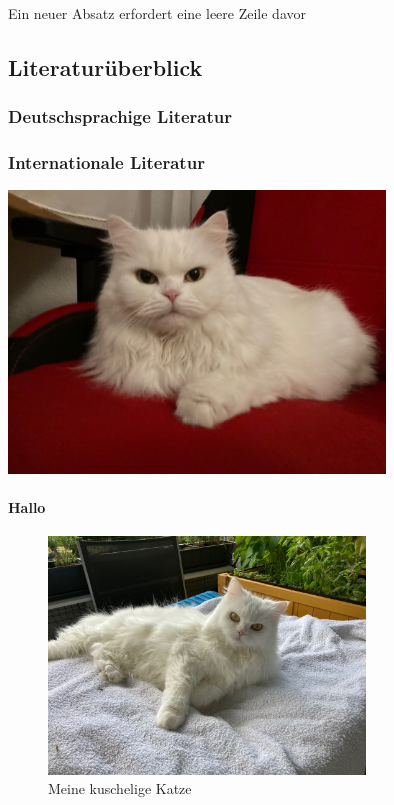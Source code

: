\documentclass[12pt,parskip=half]{scrartcl}
\begin{document}
Ein neuer Absatz erfordert eine leere Zeile davor

\blindtext[5]

\subsection{Literaturüberblick}
\subsubsection{Deutschsprachige Literatur}

\blindtext[5]

\subsubsection{Internationale Literatur}

\blindtext[5]

\begin{center}
\includegraphics[width=0.75\textwidth]{Bilder/Katze}
\label{fig:katze423}
\end{center}



\paragraph{Hallo} \blindtext[5]

\begin{figure}
\centering
\includegraphics[width=0.75\textwidth]{Bilder/Katze1}
\caption{Meine kuschelige Katze}\label{fig:katze1}
\end{figure}
\end{document}
